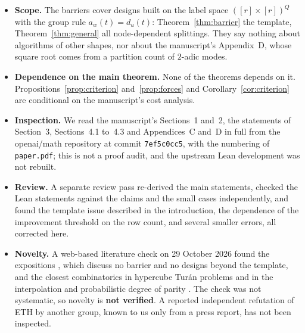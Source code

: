 \documentclass[11pt]{article}
\theoremstyle{definition}
\theoremstyle{remark}
\begin{document}
\begin{itemize}[leftmargin=2em]
\item \textbf{Scope.} The barriers cover designs built on the label space $([r]\times[r])^Q$ with the group rule $a_w(t)=d_u(t)$: Theorem~\ref{thm:barrier} the template, Theorem~\ref{thm:general} all node-dependent splittings. They say nothing about algorithms of other shapes, nor about the manuscript's Appendix~D, whose square root comes from a partition count of $2$-adic modes.
\item \textbf{Dependence on the main theorem.} None of the theorems depends on it. Propositions~\ref{prop:criterion} and~\ref{prop:forces} and Corollary~\ref{cor:criterion} are conditional on the manuscript's cost analysis.
\item \textbf{Inspection.} We read the manuscript's Sections~1 and~2, the statements of Section~3, Sections~4.1 to~4.3 and Appendices~C and~D in full from the openai/math repository at commit \texttt{7ef5c0cc5}, with the numbering of \texttt{paper.pdf}; this is not a proof audit, and the upstream Lean development was not rebuilt.
\item \textbf{Review.} A separate review pass re-derived the main statements, checked the Lean statements against the claims and the small cases independently, and found the template issue described in the introduction, the dependence of the improvement threshold on the row count, and several smaller errors, all corrected here.
\item \textbf{Novelty.} A web-based literature check on 29 October 2026 found the expositions \cite{odonnell,kintali}, which discuss no barrier and no designs beyond the template, and the closest combinatorics in hypercube Tur\'an problems \cite{aks,eil,alon,bhll} and in the interpolation and probabilistic degree of parity \cite{abfr,alman,stv}. The check was not systematic, so novelty is \textbf{not verified}. A reported independent refutation of ETH by another group, known to us only from a press report, has not been inspected.
\end{itemize}
\end{document}

